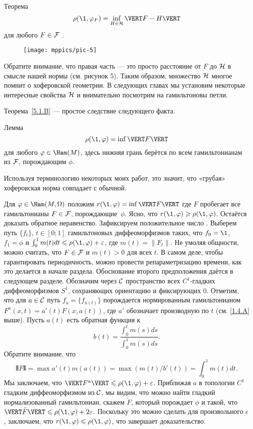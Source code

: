 \begin{thm}{Теорема}\label{5.1.B}
\[\rho (\1, \phi_F) = \inf_{H\in\H} \VERT F - H \VERT\]
для любого $F \in \mathcal{F}$ .
\end{thm}

\begin{figure}[ht!]
\vskip0mm
\centering
\texttt{[image: mppics/pic-5]}
\caption{}\label{pic-5}
\vskip0mm
\end{figure}

Обратите внимание, что правая часть --- это просто расстояние от $F$ до $\mathcal{H}$ в смысле нашей нормы (см. рисунок 5).
Таким образом, множество $\mathcal{H}$ многое помнит о хоферовской геометрии.
В следующих главах мы установим некоторые интересные свойства $\mathcal{H}$ и внимательно посмотрим на гамильтоновы петли.

Теорема~\ref{5.1.B} --- простое следствие следующего факта.

\begin{thm}{Лемма}\label{5.1.C}
\[\rho (\1, \phi) = \inf \VERT F \VERT\]
для любого $\phi \in \Ham (M)$, здесь нижняя грань берётся по всем гамильтонианам из $\mathcal{F}$, порождающим $\phi$.
\end{thm}

Используя терминологию некоторых моих работ, это значит, что «грубая» хоферовская норма совпадает с обычной.

Для $\phi \in \Ham (M, \Omega)$ положим $r (\1, \phi) \z= \inf \VERT F \VERT$ где $F$ пробегает все гамильтонианы $F \in \mathcal{F}$, порождающие~$\phi$.
Ясно, что $r (\1, \phi) \ge \rho (\1, \phi)$.
Остаётся доказать обратное неравенство.
Зафиксируем положительное число .
Выберем путь $\{f_t\}$, $t \in [0; 1]$ гамильтоновых диффеоморфизмов таких, что $f_0 = \1$, $f_1 = \phi$ и  $\int_0^1 m (t) dt \le \rho (\1, \phi) + \epsilon$, где $m (t) = \| F_t \|$.
Не умоляя общности, можно считать, что $F \in \mathcal{F}$ и $m (t)> 0$ для всех $t$.
В самом деле, чтобы гарантировать периодичность, можно провести репараметризацию времени, как это делается в начале раздела.
Обоснование второго предположения даётся в следующем разделе.
Обозначим через $\mathcal{C}$ пространство всех $C^1$-гладких диффеоморфизмов $S^1$, сохраняющих ориентацию и фиксирующих $0$.
Отметим, что для $a \in \mathcal{C}$ путь $f_a = \{f_{a(t)}\}$ порождается нормированным гамильтонианом $F^a (x, t) = a' (t) F (x, a(t))$, где $a'$ обозначает производную по $t$ (см. \ref{1.4.A} выше).
Пусть $a(t)$ есть обратная функция к 
\[b(t)
=
\frac{\int_0^t m(s)ds}{\int_0^1 m(s)ds}.\]
Обратите внимание, что 
\[\VERT F \VERT = \max a' (t) m (a (t)) = \max (m (t) / b'(t)) = \int_0^1m (t) dt.\]
Мы заключаем, что $\VERT F^a \VERT \le \rho (\1, \phi) + \epsilon$.
Приближая $a$ в топологии $C^1$ гладким диффеоморфизмом из $\mathcal{C}$, мы видим, что можно найти гладкий нормализованный гамильтониан, скажем $\tilde F$, который порождает $\phi$ и такой, что $\VERT \tilde F \VERT \le \rho (\1, \phi) + 2\epsilon$.
Поскольку это можно сделать для произвольного $\epsilon$, заключаем, что $r (\1, \phi) \le \rho (\1, \phi)$, что завершает доказательство.
\qeds

